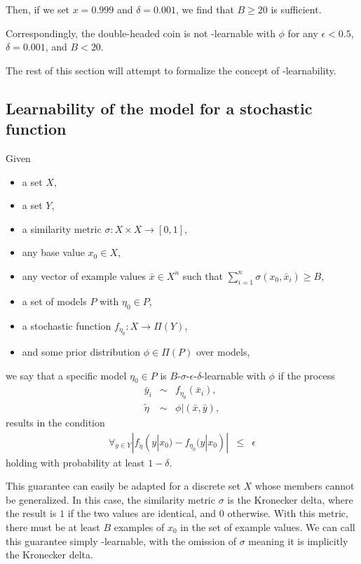 \begin{example}
Then, if we set $x=0.999$ and $\delta=0.001$, we find that $B\geq20$ is sufficient.

Correspondingly, the double-headed coin is not \bed-learnable with $\phi$ for any $\epsilon<0.5$, $\delta=0.001$, and $B<20$.


\end{example}

The rest of this section will attempt to formalize the concept of \bed-learnability.

\subsection{Learnability of the model for a stochastic function}

Given
\begin{itemize}
\item a set $X$,
\item a set $Y$,
\item a similarity metric $\sigma:X\times X\rightarrow[0,1]$,
\item any base value $x_0\in X$,
\item any vector of example values $\bar x \in X^n$ such that $\sum_{i=1}^n \sigma(x_0, \bar x_i) \geq B$,
\item a set of models $P$ with $\eta_0 \in P$,
\item a stochastic function $f_{\eta_0}:X\rightarrow\Pi(Y)$,
\item and some prior distribution $\phi \in \Pi(P)$ over models,
\end{itemize}
we say that a specific model $\eta_0 \in P$ is $B$-$\sigma$-$\epsilon$-$\delta$-learnable with $\phi$ if the process
\begin{eqnarray}
\bar y_i &\sim& f_{\eta_0}(\bar x_i),\\
\tilde\eta &\sim& \phi|(\bar x, \bar y),
\end{eqnarray}
results in the condition
\begin{eqnarray}
\forall_{y\in Y}|f_{\tilde\eta}(y|x_0)-f_{\eta_0}(y|x_0)| &\leq& \epsilon
\end{eqnarray}
holding with probability at least $1-\delta$.

This guarantee can easily be adapted for a discrete set $X$ whose members cannot be generalized. In this case, the similarity metric $\sigma$ is the Kronecker delta, where the result is $1$ if the two values are identical, and $0$ otherwise. With this metric, there must be at least $B$ examples of $x_0$ in the set of example values. We can call this guarantee simply \bed-learnable, with the omission of $\sigma$ meaning it is implicitly the Kronecker delta.


